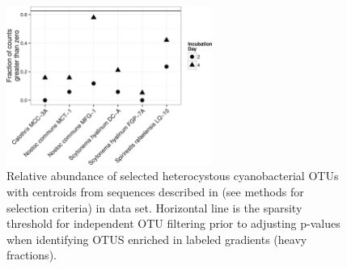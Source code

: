 \begin{figure}[h!]
  \centering
    \includegraphics[width=0.6\textwidth]{figures/het_sparsity/het_sparsity.png}
  \caption{Relative abundance of selected heterocystous cyanobacterial OTUs with centroids from sequences described in \citet{Yeager} (see methods for selection criteria) in \citet{Steven_2013} data set. Horizontal line is the sparsity threshold for independent OTU filtering prior to adjusting p-values when identifying OTUS enriched in labeled gradients (heavy fractions).}
  \label{fig:het_sparsity}
\end{figure}

